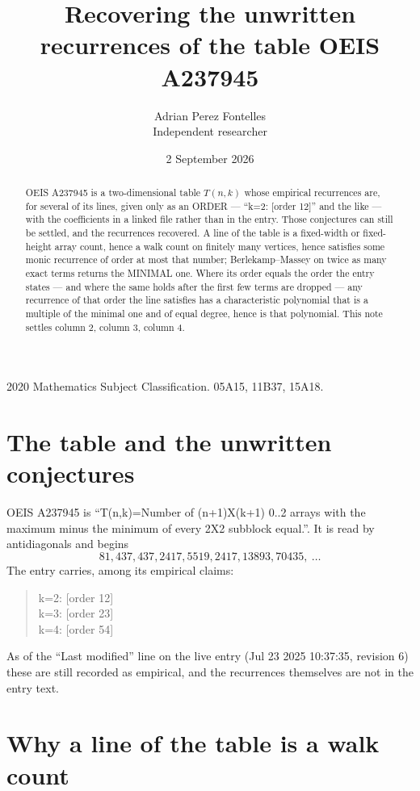 \documentclass[11pt,a4paper]{article}
\title{Recovering the unwritten recurrences of the table OEIS A237945}
\author{Adrian Perez Fontelles\\ \small Independent researcher}
\date{2 September 2026}
\theoremstyle{plain}
\theoremstyle{definition}
\begin{document}
\maketitle

\begin{abstract}
OEIS A237945 is a two-dimensional table $T(n,k)$ whose empirical recurrences are, for several of
its lines, given only as an ORDER --- ``k=2: [order 12]'' and the like --- with the
coefficients in a linked file rather than in the entry. Those conjectures can still be settled,
and the recurrences recovered. A line of the table is a fixed-width or fixed-height array
count, hence a walk count on finitely many vertices, hence satisfies some monic recurrence of
order at most that number; Berlekamp--Massey on twice as many exact terms returns the MINIMAL
one. Where its order equals the order the entry states --- and where the same holds after the
first few terms are dropped --- any recurrence of that order the line satisfies has a
characteristic polynomial that is a multiple of the minimal one and of equal degree, hence is
that polynomial. This note settles column 2, column 3, column 4.
\end{abstract}

\noindent\small 2020 Mathematics Subject Classification. 05A15, 11B37, 15A18.\normalsize

\section{The table and the unwritten conjectures}

OEIS A237945 is ``T(n,k)=Number of (n+1)X(k+1) 0..2 arrays with the maximum minus the minimum of every 2X2 subblock equal.''. It is read by antidiagonals and begins
\[
81, 437, 437, 2417, 5519, 2417, 13893, 70435,\ \dots
\]
The entry carries, among its empirical claims:
\begin{quote}\small
k=2: [order 12]\\
k=3: [order 23]\\
k=4: [order 54]
\end{quote}
As of the ``Last modified'' line on the live entry (Jul 23 2025 10:37:35, revision 6) these are still
recorded as empirical, and the recurrences themselves are not in the entry text.

\section{Why a line of the table is a walk count}
\end{document}
